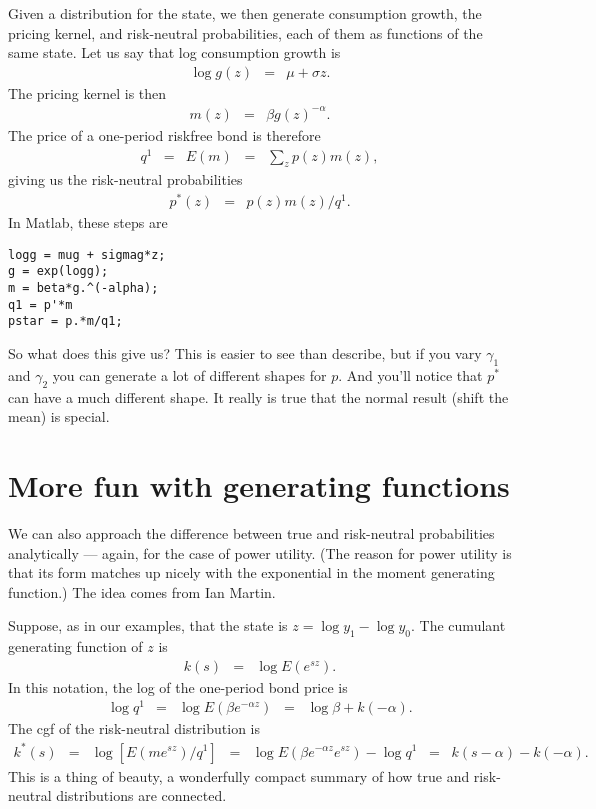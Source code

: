 \documentclass[11pt]{article}
\begin{document}
Given a distribution for the state, we then generate consumption
growth, the pricing kernel, and risk-neutral probabilities,
each of them as functions of the same state.
Let us say that log consumption growth is
\begin{eqnarray*}
    \log g(z) &=& \mu + \sigma z .
\end{eqnarray*}
The pricing kernel is then
\begin{eqnarray*}
    m(z) &=& \beta g(z)^{-\alpha}  .
\end{eqnarray*}
The price of a one-period riskfree bond is therefore
\begin{eqnarray*}
    q^1 &=& E(m) \;\;=\;\; \sum_z p(z) m(z) ,
\end{eqnarray*}
giving us the risk-neutral probabilities
\begin{eqnarray*}
    p^*(z) &=& p(z) m(z) / q^1 .
\end{eqnarray*}
In Matlab, these steps are
\begin{verbatim}
logg = mug + sigmag*z;
g = exp(logg);
m = beta*g.^(-alpha);
q1 = p'*m
pstar = p.*m/q1;
\end{verbatim}

So what does this give us?
This is easier to see than describe, but if you vary
$\gamma_1$ and $\gamma_2$ you can generate a lot of different shapes
for $p$.
And you'll notice that $p^*$ can have a much different shape.
It really is true that the normal result (shift the mean) is special.


\section{More fun with generating functions}

We can also approach the difference between true and risk-neutral
probabilities analytically --- again, for the case of power utility.
(The reason for power utility is that its form matches up nicely
with the exponential in the moment generating function.)
The idea comes from Ian Martin.

Suppose, as in our examples,
that the state is $ z = \log y_1 - \log y_0$.
The cumulant generating function  of $z$ is
\begin{eqnarray*}
    k(s) &=& \log E (e^{sz}) .
\end{eqnarray*}
In this notation, the log of the one-period bond price is
\begin{eqnarray*}
    \log q^1  &=& \log E (\beta e^{-\alpha z})
            \;\;=\;\; \log \beta +  k(-\alpha).
\end{eqnarray*}
The cgf of the risk-neutral distribution is
\begin{eqnarray}
    k^*(s) &=& \log [E (m e^{sz})/q^1]
        \;\;=\;\;   \log E \left( \beta e^{-\alpha z}e^{sz} \right) - \log q^1
        \;\;=\;\;  k(s-\alpha) - k(-\alpha)  .
        \label{eq:risk-neutral-cgf}
\end{eqnarray}
This is a thing of beauty, a wonderfully compact
summary of how true and risk-neutral distributions are connected.
\end{document}
